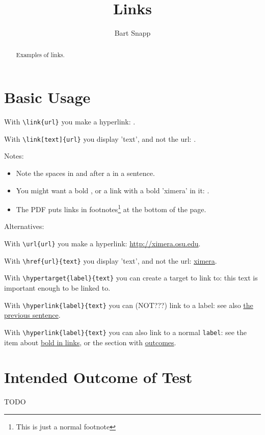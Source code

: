 \documentclass{ximera}
\title{Links}
\author{Bart Snapp}
\begin{document}
\begin{abstract}
  Examples of links.
\end{abstract}
\maketitle

\section*{Basic Usage}\label{sec:link:basicUsage}

With \verb|\link{url}| you make a hyperlink: .

With \verb|\link[text]{url}| you display 'text', and not the url: .



Notes: 
\begin{itemize}
 \item \label{link_spaces}   Note the spaces in and after a  in a sentence.
 \item \label{link_bold}     You might want a bold \textbf{}, or a link with a bold 'ximera' in it: .
 \item \label{link_footnote} The PDF puts links in footnotes\footnote{This is just a normal footnote} at the bottom of the page.
\end{itemize}

Alternatives:

With \verb|\url{url}| you make a hyperlink: \url{http://ximera.osu.edu}.

With \verb|\href{url}{text}| you display 'text', and not the url: \href{http://ximera.osu.edu}{ximera}.

With \verb|\hypertarget{label}{text}| you can create a target to link to: \hypertarget{ht_bold}{this text is important enough to be linked to}.

With \verb|\hyperlink{label}{text}| you can (NOT???) link to a label: see also \hyperlink{ht_bold}{the previous sentence}.

With \verb|\hyperlink{label}{text}| you can also link to a normal \verb|label|: see the item about \hyperlink{link_bold}{bold in links}, or the section with \hyperref[sec:link:intendedOutcome]{outcomes}.

\section*{Intended Outcome of Test}\label{sec:link:intendedOutcome}

TODO


\end{document}

